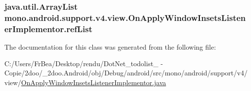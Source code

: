 \hypertarget{classmono_1_1android_1_1support_1_1v4_1_1view_1_1_on_apply_window_insets_listener_implementor_6d168ac749230c4745461fbc2e5f846a}{
\subsubsection[{refList}]{\setlength{\rightskip}{0pt plus 5cm}java.util.ArrayList {\bf mono.android.support.v4.view.OnApplyWindowInsetsListenerImplementor.refList}}}
\label{classmono_1_1android_1_1support_1_1v4_1_1view_1_1_on_apply_window_insets_listener_implementor_6d168ac749230c4745461fbc2e5f846a}




The documentation for this class was generated from the following file:\begin{CompactItemize}
\item 
C:/Users/FrBea/Desktop/rendu/DotNet\_\-todolist\_ - Copie/2doo/\_\-2doo.Android/obj/Debug/android/src/mono/android/support/v4/view/\hyperlink{_on_apply_window_insets_listener_implementor_8java}{OnApplyWindowInsetsListenerImplementor.java}\end{CompactItemize}
